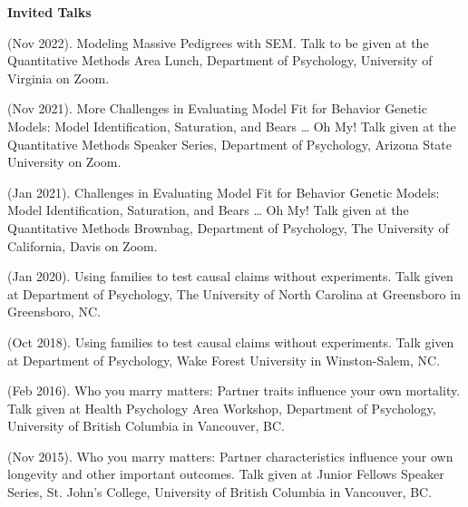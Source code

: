 {\large {\bf Invited Talks}}\begin{etaremune}

\item\meb (Nov 2022). Modeling Massive Pedigrees with SEM. Talk to be given at the Quantitative Methods Area Lunch, Department of Psychology, University of Virginia on Zoom.
\item\meb (Nov 2021). More Challenges in Evaluating Model Fit for Behavior Genetic Models: Model Identification, Saturation, and Bears … Oh My! Talk given at the Quantitative Methods Speaker Series, Department of Psychology, Arizona State University on Zoom.
%
\item\meb (Jan 2021). Challenges in Evaluating Model Fit for Behavior Genetic Models: Model Identification, Saturation, and Bears … Oh My! Talk given at the Quantitative Methods Brownbag, Department of Psychology, The University of California, Davis on Zoom.
%
\item\meb (Jan 2020). Using families to test causal claims without experiments. Talk given at Department of Psychology, The University of North Carolina at Greensboro in Greensboro, NC.
%
%
%
\item\meb (Oct 2018). Using families to test causal claims without experiments. Talk given at Department of Psychology, Wake Forest University in Winston-Salem, NC.
%
\item \meb (Feb 2016). Who you marry matters: Partner traits influence your own mortality. Talk given at Health Psychology Area Workshop, Department of Psychology, University of British Columbia in Vancouver, BC. 
%
\item \meb (Nov 2015). Who you marry matters: Partner characteristics influence your own longevity and other important outcomes. Talk given at Junior Fellows Speaker Series, St. John's College, University of British Columbia in Vancouver, BC. \smallskip
\end{etaremune}
